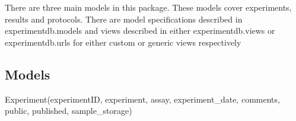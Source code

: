 \documentclass[letterpaper,10pt,english]{sphinxmanual}
\begin{document}
There are three main models in this package.  These models cover experiments, results and protocols.  There are model specifications described in experimentdb.models and views described in either experimentdb.views or experimentdb.urls for either custom or generic views respectively


\subsection{Models}
\label{api:models}\label{api:module-experimentdb.data.models}

\begin{fulllineitems}
\label{api:experimentdb.data.models.Experiment}
Experiment(experimentID, experiment, assay, experiment\_date, comments, public, published, sample\_storage)

\begin{fulllineitems}
\label{api:experimentdb.data.models.Experiment.DoesNotExist}
\end{fulllineitems}


\begin{fulllineitems}
\label{api:experimentdb.data.models.Experiment.MultipleObjectsReturned}
\end{fulllineitems}


\begin{fulllineitems}
\label{api:experimentdb.data.models.Experiment.antibodies}
\end{fulllineitems}


\begin{fulllineitems}
\label{api:experimentdb.data.models.Experiment.cellline}
\end{fulllineitems}


\end{fulllineitems}
\end{document}
